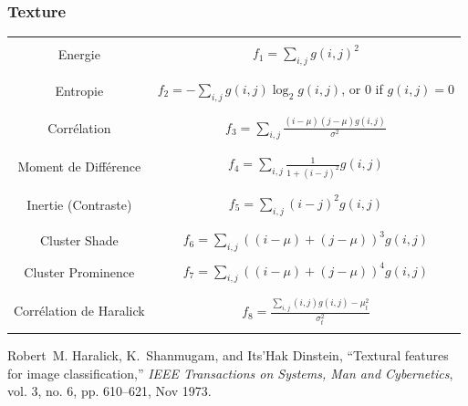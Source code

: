 \documentclass[compress]{beamer}
\begin{document}
\begin{frame}
\frametitle{Texture}
\tiny \centering
\begin{tabular}{cc}
& \\
Energie & $ f_1 = \sum_{i,j}g(i, j)^2 $ \\
& \\
& \\
Entropie & $ f_2 = -\sum_{i,j}g(i, j) \log_2 g(i, j)$, or 0 if $g(i, j) = 0$ \\
& \\
& \\
Corrélation & $ f_3 = \sum_{i,j}\frac{(i - \mu)(j - \mu)g(i, j)}{\sigma^2} $ \\
& \\
& \\
Moment de Différence&  $f_4 = \sum_{i,j}\frac{1}{1 + (i - j)^2}g(i, j) $ \\
& \\
& \\
Inertie (Contraste) & $ f_5 = \sum_{i,j}(i - j)^2g(i, j) $ \\
& \\
& \\
Cluster Shade & $ f_6 = \sum_{i,j}((i - \mu) + (j - \mu))^3 g(i, j) $ \\
& \\
Cluster Prominence & $ f_7 = \sum_{i,j}((i - \mu) + (j - \mu))^4 g(i, j) $ \\
& \\
& \\
Corrélation de Haralick& $ f_8 = \frac{\sum_{i,j}(i, j) g(i, j) -\mu_t^2}{\sigma_t^2} $ \\
& \\
\end{tabular}
\begin{thebibliography}{noidea}
\tiny
{}
Robert~M. Haralick, K.~Shanmugam, and Its'Hak Dinstein,
 ``Textural features for image classification,''
 {\em IEEE Transactions on Systems, Man and Cybernetics}, vol. 3, no.
  6, pp. 610--621, Nov 1973.
\end{thebibliography}
\end{frame}
\end{document}
